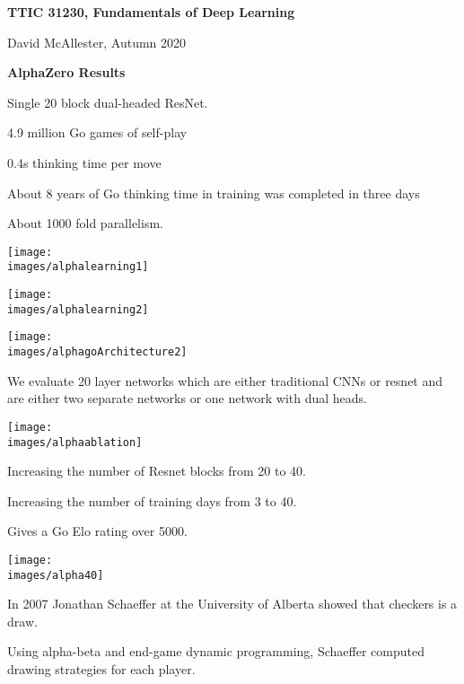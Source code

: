 




{\Huge

  \centerline{\bf TTIC 31230, Fundamentals of Deep Learning}
  \bigskip
  \centerline{David McAllester, Autumn 2020}

  \vfill
  \centerline{\bf AlphaZero Results}
  \vfill
  \vfill


Single 20 block dual-headed ResNet.

\vfill
4.9 million Go games of self-play

\vfill
0.4s thinking time per move

\vfill
About 8 years of Go thinking time in training was completed in three days

\vfill
About 1000 fold parallelism.


\centerline{\texttt{[image: \\images/alphalearning1]}}


\centerline{\texttt{[image: \\images/alphalearning2]}}


\centerline{\texttt{[image: \\images/alphagoArchitecture2]}}

\vfill
We evaluate 20 layer networks which are either traditional CNNs or resnet and are either two separate networks or one network with dual heads.


\centerline{\texttt{[image: \\images/alphaablation]}}


Increasing the number of Resnet blocks from 20 to 40.

\vfill
Increasing the number of training days from 3 to 40.

\vfill
Gives a Go Elo rating over 5000.


\centerline{\texttt{[image: \\images/alpha40]}}


In 2007 Jonathan Schaeffer at the University of Alberta showed that checkers is a draw.

\vfill
Using alpha-beta and end-game dynamic programming, Schaeffer computed drawing strategies for each player.

}
